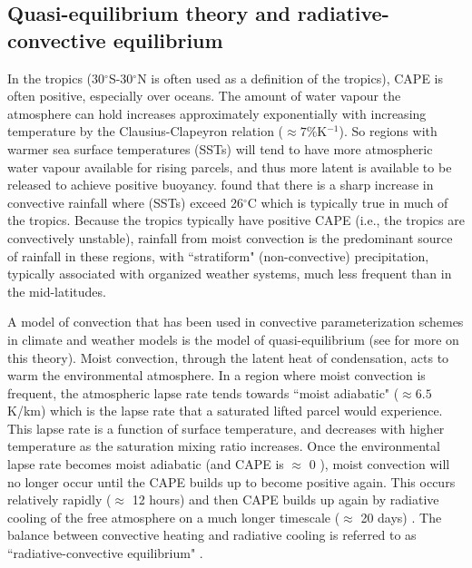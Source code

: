 \documentclass[letterpaper,12pt,titlepage,oneside,final]{book}
\begin{document}
\subsection{Quasi-equilibrium theory and radiative-convective equilibrium}\label{QET}

In the tropics (30$^\circ$S-30$^\circ$N is often used as a definition of the tropics), CAPE is often positive, especially over oceans. The amount of water vapour the atmosphere can hold increases approximately exponentially with increasing temperature by the Clausius-Clapeyron relation ($\approx {7\%}$K$^{-1}$). So regions with warmer sea surface temperatures (SSTs) will tend to have more atmospheric water vapour available for rising parcels, and thus more latent is available to be released to achieve positive buoyancy. \citep{folkins_ian_tropical_2003} found that there is a sharp increase in convective rainfall where (SSTs) exceed 26$^{\circ}$C which is typically true in much of the tropics. Because the tropics typically have positive CAPE (i.e., the tropics are convectively unstable), rainfall from moist convection is the predominant source of rainfall in these regions, with ``stratiform" (non-convective) precipitation, typically associated with organized weather systems, much less frequent than in the mid-latitudes.

A model of convection that has been used in convective parameterization schemes in climate and weather models is the model of quasi-equilibrium \citep{arakawa_and_schubert_interaction_1974} (see \cite{emanuel_quasi-equilibrium_2007} for more on this theory). Moist convection, through the latent heat of condensation, acts to warm the environmental atmosphere. In a region where moist convection is frequent, the atmospheric lapse rate tends towards ``moist adiabatic" ($\approx 6.5$K/km) which is the lapse rate that a saturated lifted parcel would experience. This lapse rate is a function of surface temperature, and decreases with higher temperature as the saturation mixing ratio increases. Once the environmental lapse rate becomes moist adiabatic (and CAPE is $\approx$ 0 \cite{merlis_general_2012}), moist convection will no longer occur until the CAPE builds up to become positive again. This occurs relatively rapidly ($\approx$ 12 hours) and then CAPE builds up again by radiative cooling of the free atmosphere on a much longer timescale ($\approx$ 20 days) \citep{merlis_general_2012}. The balance between convective heating and radiative cooling is referred to as ``radiative-convective equilibrium" \citep{manabe_thermal_1967}.
\end{document}
